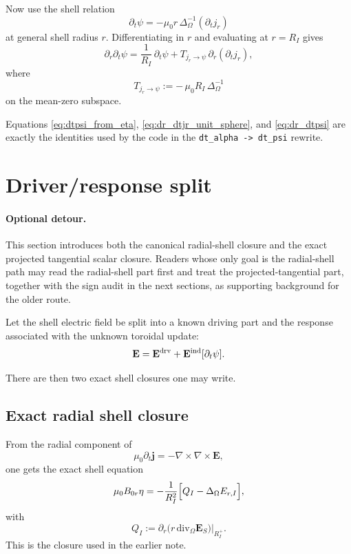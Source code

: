 \documentclass[11pt,a4paper]{article}
\begin{document}
Now use the shell relation
\[
\partial_t \psi = -\mu_0 r\,\Delta_\Omega^{-1}(\partial_t j_r)
\]
at general shell radius $r$. Differentiating in $r$ and evaluating at $r=R_I$
gives
\begin{equation}
\partial_r\partial_t \psi
=
\frac{1}{R_I}\,\partial_t\psi
+
T_{j_r\to\psi}\,\partial_r(\partial_t j_r),
\label{eq:dr_dtpsi}
\end{equation}
where
\begin{equation}
T_{j_r\to\psi}
:=
-\,\mu_0 R_I\,\Delta_\Omega^{-1}
\label{eq:T_jr_to_psi}
\end{equation}
on the mean-zero subspace.

Equations \eqref{eq:dtpsi_from_eta}, \eqref{eq:dr_dtjr_unit_sphere}, and
\eqref{eq:dr_dtpsi} are exactly the identities used by the code in the
\texttt{dt\_alpha -> dt\_psi} rewrite.

\section{Driver/response split}

\paragraph{Optional detour.}
This section introduces both the canonical radial-shell closure and the exact
projected tangential scalar closure. Readers whose only goal is the radial-shell
path may read the radial-shell part first and treat the projected-tangential
part, together with the sign audit in the next sections, as supporting
background for the older  route.

Let the shell electric field be split into a known driving part and the
response associated with the unknown toroidal update:
\[
\mathbf E = \mathbf E^{\rm drv} + \mathbf E^{\rm ind}[\partial_t\psi].
\]

There are then two exact shell closures one may write.

\subsection*{Exact radial shell closure}

From the radial component of
\[
\mu_0 \partial_t \mathbf j = -\nabla\times\nabla\times \mathbf E,
\]
one gets the exact shell equation
\begin{equation}
\mu_0 B_{0r}\eta
=
-\frac{1}{R_I^2}\Bigl[Q_I - \Delta_\Omega E_{r,I}\Bigr],
\label{eq:radial_shell_balance}
\end{equation}
with
\[
Q_I := \partial_r\!\bigl(r\,\mathrm{div}_\Omega \mathbf E_S\bigr)\Big|_{R_I^+}.
\]
This is the closure used in the earlier note.
\end{document}
